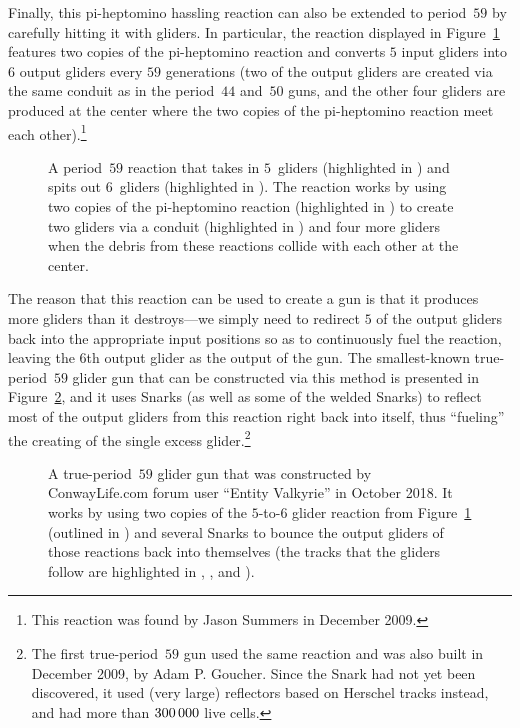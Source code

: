 Finally, this pi-heptomino hassling reaction can also be extended to period~$59$ by carefully hitting it with gliders. In particular, the reaction displayed in Figure~\ref{fig:p59_glider_reaction} features two copies of the pi-heptomino reaction and converts  $5$ input gliders into $6$ output gliders every $59$ generations (two of the output gliders are created via the same conduit as in the period~$44$ and~$50$ guns, and the other four gliders are produced at the center where the two copies of the pi-heptomino reaction meet each other).\footnote{This reaction was found by Jason Summers in December 2009.}

\begin{figure}[!htb]
	\centering
	\caption{A period~$59$ reaction that takes in $5$~gliders (highlighted in ) and spits out $6$~gliders (highlighted in ). The reaction works by using two copies of the pi-heptomino reaction (highlighted in ) to create two gliders via a conduit (highlighted in ) and four more gliders when the debris from these reactions collide with each other at the center.}\label{fig:p59_glider_reaction}
\end{figure}

The reason that this reaction can be used to create a gun is that it produces more gliders than it destroys---we simply need to redirect $5$ of the output gliders back into the appropriate input positions so as to continuously fuel the reaction, leaving the $6$th output glider as the output of the gun. The smallest-known true-period~$59$ glider gun that can be constructed via this method is presented in Figure~\ref{fig:p59_glider_gun}, and it uses Snarks (as well as some of the welded Snarks) to reflect most of the output gliders from this reaction right back into itself, thus ``fueling'' the creating of the single excess glider.\footnote{The first true-period~$59$ gun used the same reaction and was also built in December 2009, by Adam P. Goucher. Since the Snark had not yet been discovered, it used (very large) reflectors based on Herschel tracks instead, and had more than $300{\,}000$ live cells.}

\begin{figure}[!htb]
	\centering
	\caption{A true-period~$59$ glider gun that was constructed by ConwayLife.com forum user ``Entity Valkyrie'' in October 2018. It works by using two copies of the $5$-to-$6$ glider reaction from Figure~\ref{fig:p59_glider_reaction} (outlined in ) and several Snarks to bounce the output gliders of those reactions back into themselves (the tracks that the gliders follow are highlighted in , , and ).}\label{fig:p59_glider_gun}
\end{figure}

